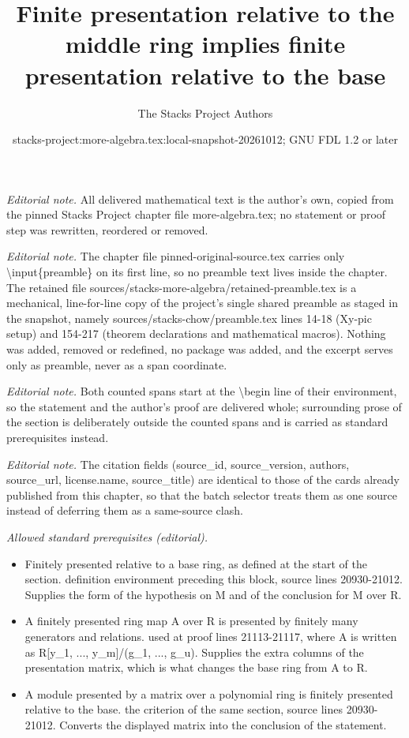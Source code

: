\documentclass[10pt,a4paper]{amsart}
\title{Finite presentation relative to the middle ring implies finite presentation relative to the base}
\author{The Stacks Project Authors}
\date{stacks-project:more-algebra.tex:local-snapshot-20261012; GNU FDL 1.2 or later}
\theoremstyle{plain}
\theoremstyle{definition}
\theoremstyle{remark}
\numberwithin{equation}{subsection}
\begin{document}
\maketitle
\setcounter{subsection}{1}
\noindent\textit{Editorial note.} All delivered mathematical text is the author's own, copied from the pinned Stacks Project chapter file more-algebra.tex; no statement or proof step was rewritten, reordered or removed.\par\medskip
\noindent\textit{Editorial note.} The chapter file pinned-original-source.tex carries only \textbackslash{}input\{preamble\} on its first line, so no preamble text lives inside the chapter. The retained file sources/stacks-more-algebra/retained-preamble.tex is a mechanical, line-for-line copy of the project's single shared preamble as staged in the snapshot, namely sources/stacks-chow/preamble.tex lines 14-18 (Xy-pic setup) and 154-217 (theorem declarations and mathematical macros). Nothing was added, removed or redefined, no package was added, and the excerpt serves only as preamble, never as a span coordinate.\par\medskip
\noindent\textit{Editorial note.} Both counted spans start at the \textbackslash{}begin line of their environment, so the statement and the author's proof are delivered whole; surrounding prose of the section is deliberately outside the counted spans and is carried as standard prerequisites instead.\par\medskip
\noindent\textit{Editorial note.} The citation fields (source\_id, source\_version, authors, source\_url, license.name, source\_title) are identical to those of the cards already published from this chapter, so that the batch selector treats them as one source instead of deferring them as a same-source clash.\par\medskip
\noindent\textit{Allowed standard prerequisites (editorial).}\begin{itemize}
\item Finitely presented relative to a base ring, as defined at the start of the section. definition environment preceding this block, source lines 20930-21012. Supplies the form of the hypothesis on M and of the conclusion for M over R.
\item A finitely presented ring map A over R is presented by finitely many generators and relations. used at proof lines 21113-21117, where A is written as R[y\_1, ..., y\_m]/(g\_1, ..., g\_u). Supplies the extra columns of the presentation matrix, which is what changes the base ring from A to R.
\item A module presented by a matrix over a polynomial ring is finitely presented relative to the base. the criterion of the same section, source lines 20930-21012. Converts the displayed matrix into the conclusion of the statement.
\end{itemize}\medskip
\end{document}
